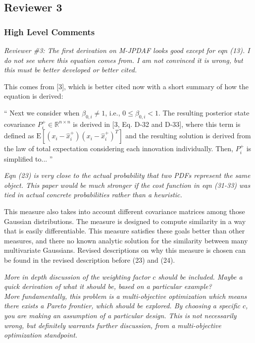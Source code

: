\documentclass[11pt]{article}
\renewcommand{\Re}{\ensuremath{\mathbb{R}}}
\newenvironment{correction}{\begin{list}{}{\setlength{\leftmargin}{1cm}\setlength{\rightmargin}{1cm}}\vspace{\parsep}\item[]``}{''\end{list}}
\begin{document}
\begin{itemize}





\subsection*{Reviewer 3}

\subsubsection*{High Level Comments}

\item {\itshape Reviewer \#3: The first derivation on M-JPDAF looks good except for eqn (13).  I do not see where this equation comes from.  I am not convinced it is wrong, but this must be better developed or better cited.}

This comes from [3], which is better cited now with a short summary of how the equation is derived:

\begin{correction}
Next we consider when $\beta_{0,i}\neq1$, i.e., $0\leq\beta_{0,i}<1$. The resulting posterior state covariance $P^+_{i}\in\Re^{n\times n}$ is derived in [3, Eq. D-32 and D-33], where this term is defined as $\text{E}[(x_i-\hat x_i^+)(x_i-\hat x_i^+)^T]$ and the resulting solution is derived from the law of total expectation considering each innovation individually. Then, $P^+_{i}$ is simplified to...
\end{correction}

\item {\itshape Eqn (23) is very close to the actual probability that two PDFs represent the same object.  This paper would be much stronger if the cost function in eqn (31-33) was tied in actual concrete probabilities rather than a heuristic.}

This measure also takes into account different covariance matrices among those Gaussian distributions. The measure is designed to compute similarity in a way that is easily differentiable. This measure satisfies these goals better than other measures, and there no known analytic solution for the similarity between many multivariate Gaussians. Revised descriptions on why this measure is chosen can be found in the revised description before (23) and (24).

\item {\itshape More in depth discussion of the weighting factor $c$ should be included.  Maybe a quick derivation of what it should be, based on a particular example?
\\
More fundamentally, this problem is a multi-objective optimization which means there exists a Pareto frontier, which should be explored.  By choosing a specific $c$, you are making an assumption of a particular design.  This is not necessarily wrong, but definitely warrants further discussion, from a multi-objective optimization standpoint.}


\end{itemize}
\end{document}
